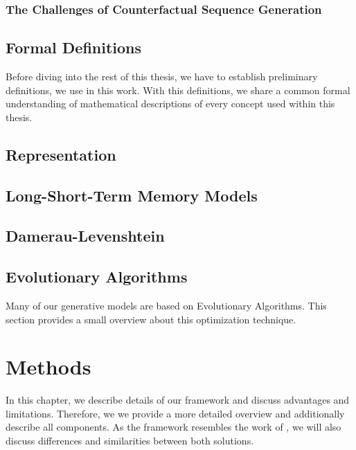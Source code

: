 \documentclass[12pt,a4paper]{report}
\begin{document}
\subsection{The Challenges of Counterfactual Sequence Generation}



\section{Formal Definitions}
\label{sec:formulas}
Before diving into the rest of this thesis, we have to establish preliminary definitions, we use in this work. With this definitions, we share a common formal understanding of mathematical descriptions of every concept used within this thesis. 


\section{Representation}
\label{sec:representation}


\section{Long-Short-Term Memory Models}
\label{sec:lstm}


\section{Damerau-Levenshtein}
\label{sec:damerau}


\section{Evolutionary Algorithms}
\label{sec:evo}
Many of our generative models are based on Evolutionary Algorithms. This section provides a small overview about this optimization technique.  



\chapter{Methods}
\label{sec:methods}
In this chapter, we describe details of our framework  and discuss advantages and limitations. 
Therefore, we we provide a more detailed overview and additionally describe all components. As the framework resembles the work of \citeauthor{hsieh_DiCE4ELInterpretingProcess_2021}, we will also discuss differences and similarities between both solutions. 
\end{document}
